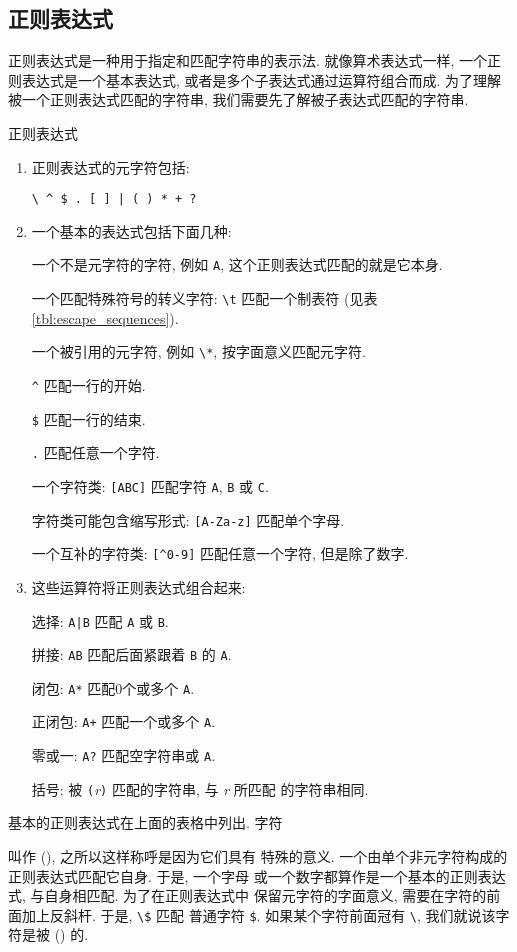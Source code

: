 \subsection{正则表达式}
\label{subsec:regular_expressions}
正则表达式是一种用于指定和匹配字符串的表示法. 就像算术表达式一样,
一个正则表达式是一个基本表达式, 或者是多个子表达式通过运算符组合而成.
为了理解被一个正则表达式匹配的字符串, 我们需要先了解被子表达式匹配的字符串.
\begin{summary}{正则表达式}
\begin{enumerate}
\item 正则表达式的元字符包括: \par
    \verb'\ ^ $ . [ ] | ( ) * + ?'
\item 一个基本的表达式包括下面几种: \par
    一个不是元字符的字符, 例如 \verb'A', 这个正则表达式匹配的就是它本身. \par
    一个匹配特殊符号的转义字符: \verb'\t' 匹配一个制表符 (见表
    \ref{tbl:escape_sequences}). \par
    一个被引用的元字符, 例如 \verb'\*', 按字面意义匹配元字符. \par
    \verb'^' 匹配一行的开始. \par
    \verb'$' 匹配一行的结束. \par
    \verb'.' 匹配任意一个字符. \par
    一个字符类: \verb'[ABC]' 匹配字符 \verb'A', \verb'B' 或 \verb'C'. \par
    字符类可能包含缩写形式: \verb'[A-Za-z]' 匹配单个字母. \par
    一个互补的字符类: \verb'[^0-9]' 匹配任意一个字符, 但是除了数字.
\item 这些运算符将正则表达式组合起来:   \par
    选择: \verb'A|B' 匹配 \verb'A' 或 \verb'B'. \par
    拼接: \verb'AB' 匹配后面紧跟着 \verb'B' 的 \verb'A'. \par
    闭包: \verb'A*' 匹配0个或多个 \verb'A'. \par
    正闭包: \verb'A+' 匹配一个或多个 \verb'A'. \par
    零或一: \verb'A?' 匹配空字符串或 \verb'A'. \par
    括号: 被 \verb'('\textit{r}\verb')' 匹配的字符串, 与 \textit{r} 所匹配 
    的字符串相同.
\end{enumerate}
\end{summary}

基本的正则表达式在上面的表格中列出. 字符
叫作  (), 之所以这样称呼是因为它们具有
特殊的意义. 一个由单个非元字符构成的正则表达式匹配它自身. 于是, 一个字母
或一个数字都算作是一个基本的正则表达式, 与自身相匹配.  为了在正则表达式中
保留元字符的字面意义, 需要在字符的前面加上反斜杆. 于是, \verb'\$' 匹配
普通字符 \verb'$'. 如果某个字符前面冠有 \verb'\', 我们就说该字符是被
 () 的.


